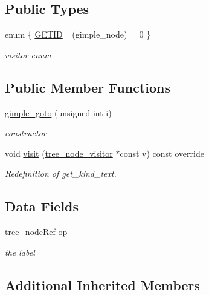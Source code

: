 \subsection*{Public Types}
\begin{DoxyCompactItemize}
\item 
enum \{ \hyperlink{structgimple__goto_a2a1bdfae18442f51c50d1d6fa66450cba935a81b29810df4251e057e4763980ab}{G\+E\+T\+ID} =(gimple\+\_\+node) = 0
 \}\begin{DoxyCompactList}\small\item\em visitor enum \end{DoxyCompactList}
\end{DoxyCompactItemize}
\subsection*{Public Member Functions}
\begin{DoxyCompactItemize}
\item 
\hyperlink{structgimple__goto_a5d49b12cbf733ff6706d72931e2b04ee}{gimple\+\_\+goto} (unsigned int i)
\begin{DoxyCompactList}\small\item\em constructor \end{DoxyCompactList}\item 
void \hyperlink{structgimple__goto_a201fad3cf9302bdcd1c462b9d581d298}{visit} (\hyperlink{classtree__node__visitor}{tree\+\_\+node\+\_\+visitor} $\ast$const v) const override
\begin{DoxyCompactList}\small\item\em Redefinition of get\+\_\+kind\+\_\+text. \end{DoxyCompactList}\end{DoxyCompactItemize}
\subsection*{Data Fields}
\begin{DoxyCompactItemize}
\item 
\hyperlink{tree__node_8hpp_a6ee377554d1c4871ad66a337eaa67fd5}{tree\+\_\+node\+Ref} \hyperlink{structgimple__goto_a8bf74a612541fe1691220fe73214eec3}{op}
\begin{DoxyCompactList}\small\item\em the label \end{DoxyCompactList}\end{DoxyCompactItemize}
\subsection*{Additional Inherited Members}


